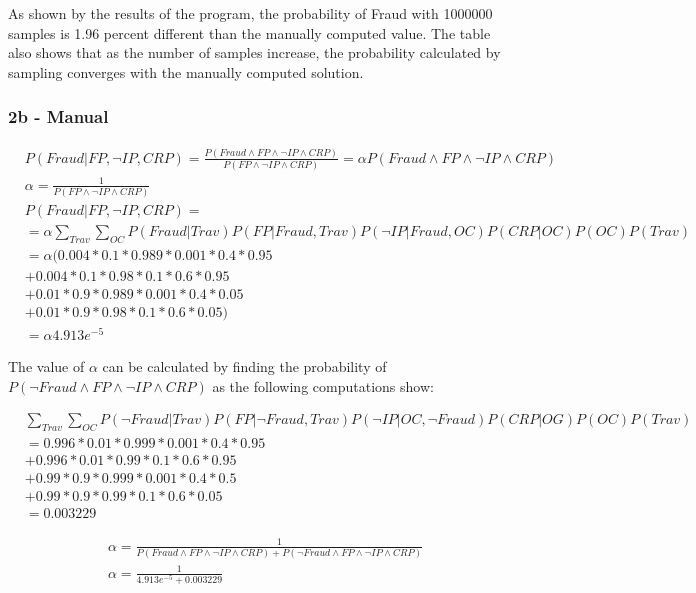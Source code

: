 \documentclass[a4paper,11pt]{report}
\begin{document}
			As shown by the results of the program, the probability of Fraud with 1000000 samples is 1.96 percent different than the manually computed value. The table also shows that as the number of samples increase, the probability calculated by sampling converges with the manually computed solution.
			
		\subsubsection{2b - Manual}
		   \begin{align*}
		   &P(Fraud|FP, \neg IP, CRP) = \frac{P(Fraud \wedge FP \wedge \neg IP \wedge CRP)}{P(FP \wedge \neg IP \wedge CRP)} =\alpha P(Fraud \wedge FP \wedge \neg IP \wedge CRP)\\
		   &\alpha =  \frac{1}{P(FP \wedge \neg IP \wedge CRP)} \\
		   &P(Fraud|FP, \neg IP, CRP) = \\
		   &= \alpha \displaystyle\sum\limits_{Trav} \displaystyle\sum\limits_{OC} P(Fraud|Trav) P(FP|Fraud, Trav) P(\neg IP|Fraud, OC) P(CRP|OC) P(OC) P(Trav) \\
		   &= \alpha(0.004*0.1*0.989*0.001*0.4*0.95 \\
		      &+ 0.004*0.1*0.98*0.1*0.6*0.95 \\
		      &+ 0.01*0.9*0.989*0.001*0.4*0.05 \\
		      &+ 0.01*0.9*0.98*0.1*0.6*0.05) \\
		   &=\alpha 4.913e^{-5}
		   \end{align*}
		
		The value of $\alpha$ can be calculated by finding the probability of $P(\neg Fraud \wedge FP \wedge \neg IP \wedge CRP)$ as the following computations show:
		
		   \begin{align*}
		   &\displaystyle\sum\limits_{Trav} \displaystyle\sum\limits_{OC} P(\neg Fraud|Trav) P(FP| \neg Fraud, Trav) P(\neg IP|OC, \neg Fraud) P(CRP|OG) P(OC) P(Trav) \\
		   &= 0.996*0.01*0.999*0.001*0.4*0.95 \\
		      &+ 0.996*0.01*0.99*0.1*0.6*0.95 \\
		      &+ 0.99*0.9*0.999*0.001*0.4*0.5 \\
		      &+ 0.99*0.9*0.99*0.1*0.6*0.05 \\
		   &= 0.003229
		   \end{align*}
		   
		     \begin{align*}
		   &\alpha = \frac{1}{P(Fraud \wedge FP \wedge \neg IP \wedge CRP) +P(\neg Fraud \wedge FP \wedge \neg IP \wedge CRP)} \\
		   &\alpha = \frac{1}{4.913e^{-5} +  0.003229} \\
		    \end{align*}
		    
\end{document}
